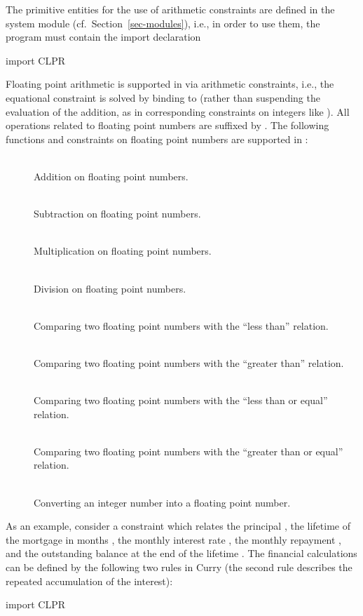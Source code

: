 {The primitive entities for the use of arithmetic constraints
are defined in the system module 
(cf.\ Section~\ref{sec-modules}), i.e., in order to use them,
the program must contain the import declaration
\begin{curry}
import CLPR
\end{curry}
Floating point arithmetic is supported in \CYS
via arithmetic constraints, i.e., the equational constraint
 is solved by binding  to 
(rather than suspending the evaluation of the addition,
as in corresponding constraints on integers like
). All operations related to
floating point numbers are suffixed by .
The following functions and constraints on floating point
numbers are supported in \CYS:
\begin{description}
\item[]~\\
Addition on floating point numbers.
\item[]~\\
Subtraction on floating point numbers.
\item[]~\\
Multiplication on floating point numbers.
\item[]~\\
Division on floating point numbers.
\item[]~\\
Comparing two floating point numbers with the ``less than'' relation.
\item[]~\\
Comparing two floating point numbers with the ``greater than'' relation.
\item[]~\\
Comparing two floating point numbers with the ``less than or equal'' relation.
\item[]~\\
Comparing two floating point numbers with the ``greater than or equal''
relation.
\item[]~\\
Converting an integer number into a floating point number.
\end{description}
As an example, consider a constraint 
which relates the principal ,
the lifetime of the mortgage in months ,
the monthly interest rate ,
the monthly repayment ,
and the outstanding balance at the end of the lifetime .
The financial calculations
can be defined by the following two rules in Curry (the second rule
describes the repeated accumulation of the interest):
\begin{curry}
import CLPR


\end{curry}}
